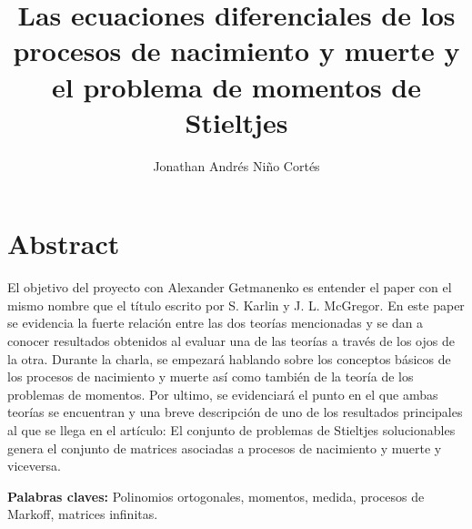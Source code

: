 \documentclass[letter,twoside,12pt]{article}
\title{Las ecuaciones diferenciales de los procesos de nacimiento y muerte y el problema de momentos de Stieltjes}
\author{Jonathan Andrés Niño Cortés}
\numberwithin{equation}{section}
\begin{document}
\maketitle

\section{Abstract}

El objetivo del proyecto con Alexander Getmanenko es entender el paper con el mismo nombre que el título escrito por S. Karlin y J. L. McGregor. En este paper se evidencia la fuerte relación entre las dos teorías mencionadas y se dan a conocer resultados obtenidos al evaluar una de las teorías a través de los ojos de la otra. Durante la charla, se empezará hablando sobre los conceptos básicos de los procesos de nacimiento y muerte así como también de la teoría de los problemas de momentos. Por ultimo, se evidenciará el punto en el que ambas teorías se encuentran y una breve descripción de uno de los resultados principales al que se llega en el artículo: El conjunto de problemas de Stieltjes solucionables genera el conjunto de matrices asociadas a procesos de nacimiento y muerte y viceversa.
\cite{chihara_introduction_2011}
\cite{_introduction_1968}
\cite{_introduction_1971}
\cite{karlin_differential_1957}

\textbf{Palabras claves:} Polinomios ortogonales, momentos, medida, procesos de Markoff, matrices infinitas.


   
    
\end{document}
